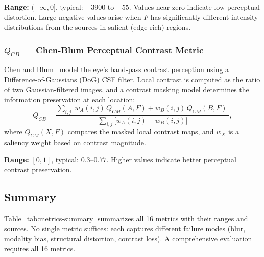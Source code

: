 \documentclass[a4paper,12pt]{article}
\begin{document}
\textbf{Range:} $(-\infty, 0]$, typical: $-3900$ to $-55$.
Values near zero indicate low perceptual distortion. Large negative values
arise when $F$ has significantly different intensity distributions from the
sources in salient (edge-rich) regions.

\subsubsection{$Q_{CB}$ --- Chen-Blum Perceptual Contrast Metric}

Chen and Blum~\cite{chen2009} model the eye's band-pass contrast perception
using a Difference-of-Gaussians (DoG) CSF filter. Local contrast is computed
as the ratio of two Gaussian-filtered images, and a contrast masking model
determines the information preservation at each location:
\begin{equation}
  Q_{CB} = \frac{\sum_{i,j}\bigl[w_A(i,j) \, Q_{CM}(A,F) + w_B(i,j) \, Q_{CM}(B,F)\bigr]}
                 {\sum_{i,j}\bigl[w_A(i,j) + w_B(i,j)\bigr]},
\end{equation}
where $Q_{CM}(X,F)$ compares the masked local contrast maps, and $w_X$
is a saliency weight based on contrast magnitude.

\textbf{Range:} $[0,1]$, typical: $0.3$--$0.77$.
Higher values indicate better perceptual contrast preservation.

\subsection{Summary}

Table~\ref{tab:metrics-summary} summarizes all 16 metrics with their ranges
and sources. No single metric suffices: each captures different failure modes
(blur, modality bias, structural distortion, contrast loss). A comprehensive
evaluation requires all 16 metrics.
\end{document}
